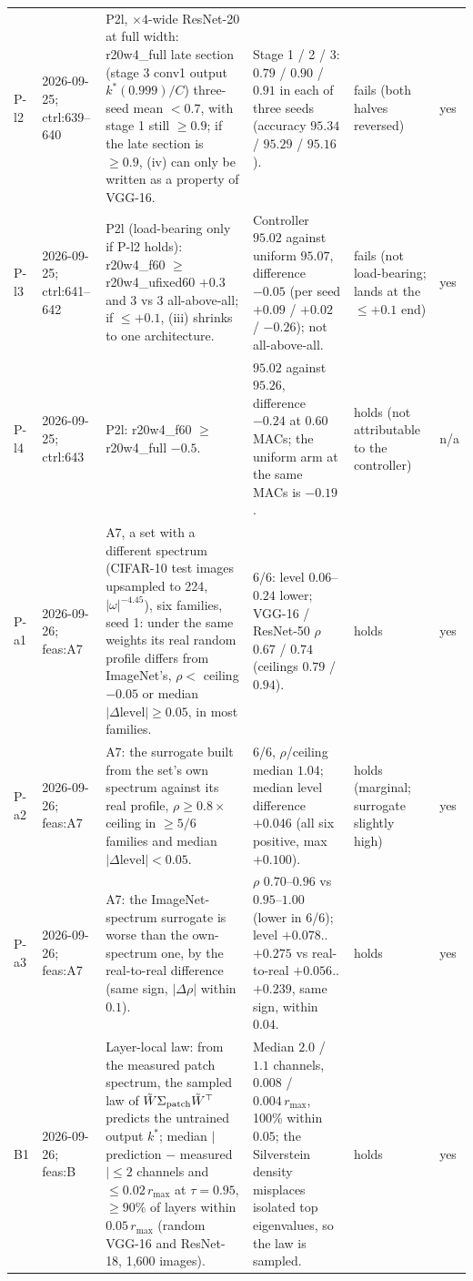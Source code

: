 \begin{longtable}{p{1.1cm}p{1.4cm}p{6.2cm}p{4.6cm}p{2.0cm}p{1.6cm}}
P-l2 & 2026-09-25; ctrl:639--640 & P2l, $\times 4$-wide ResNet-20 at full width: r20w4\_full late section (stage 3 conv1 output $k^*(0.999)/C$) three-seed mean $< 0.7$, with stage 1 still $\ge 0.9$; if the late section is $\ge 0.9$, (iv) can only be written as a property of VGG-16. & Stage 1 / 2 / 3: $0.79$ / $0.90$ / $0.91$ in each of three seeds (accuracy $95.34$ / $95.29$ / $95.16$). & fails (both halves reversed) & yes \\
P-l3 & 2026-09-25; ctrl:641--642 & P2l (load-bearing only if P-l2 holds): r20w4\_f60 $\ge$ r20w4\_ufixed60 $+ 0.3$ and 3 vs 3 all-above-all; if $\le +0.1$, (iii) shrinks to one architecture. & Controller $95.02$ against uniform $95.07$, difference $-0.05$ (per seed $+0.09$ / $+0.02$ / $-0.26$); not all-above-all. & fails (not load-bearing; lands at the $\le +0.1$ end) & yes \\
P-l4 & 2026-09-25; ctrl:643 & P2l: r20w4\_f60 $\ge$ r20w4\_full $- 0.5$. & $95.02$ against $95.26$, difference $-0.24$ at $0.60$ MACs; the uniform arm at the same MACs is $-0.19$. & holds (not attributable to the controller) & n/a \\
P-a1 & 2026-09-26; feas:A7 & A7, a set with a different spectrum (CIFAR-10 test images upsampled to 224, $|\omega|^{-4.45}$), six families, seed 1: under the same weights its real random profile differs from ImageNet's, $\rho <$ ceiling $- 0.05$ or median $|\Delta\text{level}| \ge 0.05$, in most families. & 6/6: level $0.06$--$0.24$ lower; VGG-16 / ResNet-50 $\rho$ $0.67$ / $0.74$ (ceilings $0.79$ / $0.94$). & holds & yes \\
P-a2 & 2026-09-26; feas:A7 & A7: the surrogate built from the set's own spectrum against its real profile, $\rho \ge 0.8\times$ ceiling in $\ge 5/6$ families and median $|\Delta\text{level}| < 0.05$. & 6/6, $\rho$/ceiling median $1.04$; median level difference $+0.046$ (all six positive, max $+0.100$). & holds (marginal; surrogate slightly high) & yes \\
P-a3 & 2026-09-26; feas:A7 & A7: the ImageNet-spectrum surrogate is worse than the own-spectrum one, by the real-to-real difference (same sign, $|\Delta\rho|$ within $0.1$). & $\rho$ $0.70$--$0.96$ vs $0.95$--$1.00$ (lower in 6/6); level $+0.078$..$+0.275$ vs real-to-real $+0.056$..$+0.239$, same sign, within $0.04$. & holds & yes \\
B1 & 2026-09-26; feas:B & Layer-local law: from the measured patch spectrum, the sampled law of $\tilde W \Sigma_{\rm patch} \tilde W^{\top}$ predicts the untrained output $k^*$; median $|$prediction $-$ measured$| \le 2$ channels and $\le 0.02\,r_{\max}$ at $\tau = 0.95$, $\ge 90\%$ of layers within $0.05\,r_{\max}$ (random VGG-16 and ResNet-18, 1,600 images). & Median $2.0$ / $1.1$ channels, $0.008$ / $0.004\,r_{\max}$, 100\% within $0.05$; the Silverstein density misplaces isolated top eigenvalues, so the law is sampled. & holds & yes \\

\end{longtable}
